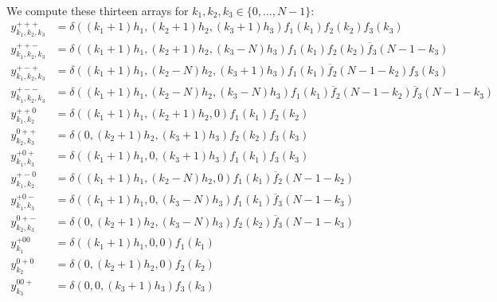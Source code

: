 We compute these thirteen arrays for $k_1,k_2,k_3\in\{0,\hdots,N-1\}$:
\begin{align*}
y^{+++}_{k_1,k_2,k_3}&=\delta((k_1+1)h_1,(k_2+1)h_2,(k_3+1)h_3) f_1(k_1) f_2(k_2) f_3(k_3)\\
y^{++-}_{k_1,k_2,k_3}&=\delta((k_1+1)h_1,(k_2+1)h_2,(k_3-N)h_3) f_1(k_1) f_2(k_2) \overline{f}_3(N-1-k_3)\\
y^{+-+}_{k_1,k_2,k_3}&=\delta((k_1+1)h_1,(k_2-N)h_2,(k_3+1)h_3) f_1(k_1) \overline{f}_2(N-1-k_2) f_3(k_3)\\
y^{+--}_{k_1,k_2,k_3}&=\delta((k_1+1)h_1,(k_2-N)h_2,(k_3-N)h_3) f_1(k_1) \overline{f}_2(N-1-k_2) \overline{f}_3(N-1-k_3)\\
y^{++0}_{k_1,k_2}    &=\delta((k_1+1)h_1,(k_2+1)h_2,         0) f_1(k_1) f_2(k_2)\\
y^{0++}_{k_2,k_3}    &=\delta(         0,(k_2+1)h_2,(k_3+1)h_3) f_2(k_2) f_3(k_3)\\
y^{+0+}_{k_1,k_3}    &=\delta((k_1+1)h_1,0         ,(k_3+1)h_3) f_1(k_1) f_3(k_3)\\
y^{+-0}_{k_1,k_2}    &=\delta((k_1+1)h_1,(k_2-N)h_2,         0) f_1(k_1) \overline{f}_2(N-1-k_2)\\
y^{+0-}_{k_1,k_3}    &=\delta((k_1+1)h_1,0         ,(k_3-N)h_3) f_1(k_1) \overline{f}_3(N-1-k_3)\\
y^{0+-}_{k_2,k_3}    &=\delta(         0,(k_2+1)h_2,(k_3-N)h_3) f_2(k_2) \overline{f}_3(N-1-k_3)\\
y^{+00}_{k_1}        &=\delta((k_1+1)h_1,0         ,         0) f_1(k_1)\\
y^{0+0}_{k_2}        &=\delta(         0,(k_2+1)h_2,         0) f_2(k_2)\\
y^{00+}_{k_3}        &=\delta(         0,0         ,(k_3+1)h_3) f_3(k_3)
\end{align*}


